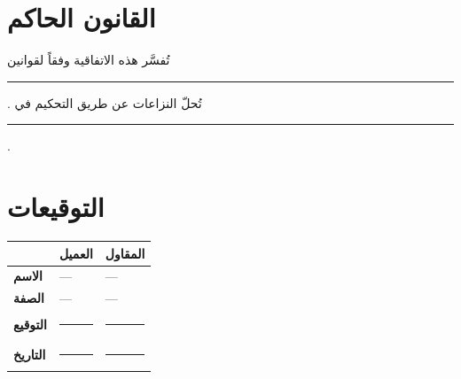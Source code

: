 \documentclass[12pt,a4paper]{article}
\begin{document}
\section{القانون الحاكم}
\label{sec:law}
تُفسَّر هذه الاتفاقية وفقاً لقوانين \rule{6cm}{0.4pt}. تُحلّ النزاعات عن طريق التحكيم في \rule{4cm}{0.4pt}.

\vspace{2em}
\section*{التوقيعات}

\begin{table}[H]
\centering
\renewcommand{\arraystretch}{2.5}
\begin{tabularx}{\textwidth}{L{5cm} X X}
\toprule
& \textbf{العميل} & \textbf{المقاول} \\
\midrule
\textbf{الاسم} & --- & --- \\
\textbf{الصفة} & --- & --- \\
\textbf{التوقيع} & \rule{4cm}{0.4pt} & \rule{4cm}{0.4pt} \\
\textbf{التاريخ} & \rule{4cm}{0.4pt} & \rule{4cm}{0.4pt} \\
\bottomrule
\end{tabularx}
\end{table}
\end{document}
